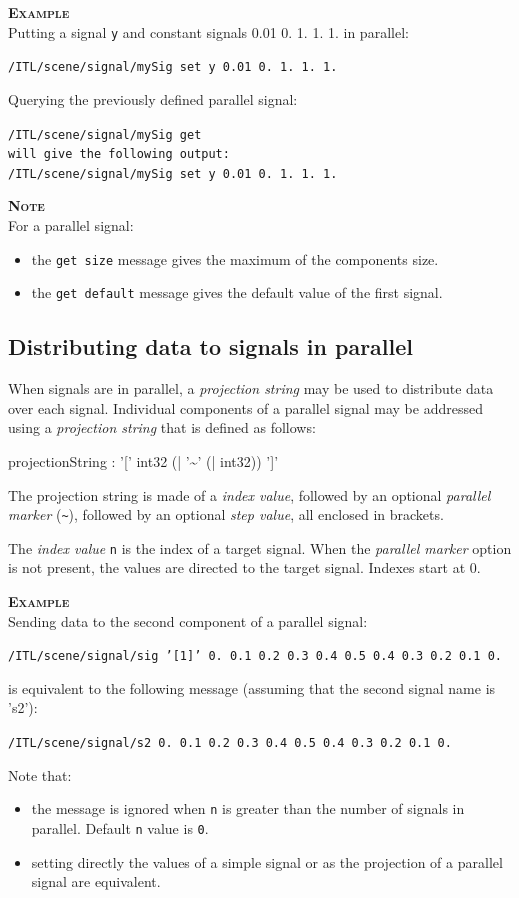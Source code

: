 \documentclass[a4paper,twoside]{report}
\newcommand{\subsublevel}[1]	{\subsection{#1}}
\newcommand{\OSC}[1]		{\texttt{#1}}
\newcommand{\values}[1]	{\texttt{#1}}
\newcommand{\example}		{\textbf{\hspace{-1.5cm}\textbf{\textsc{Example }}}}
\newcommand{\note}	[1]		{\vspace{2mm}\textbf{\hspace{-1.03cm}\textbf{\textsc{Note #1}}}}
\newcommand{\sample}	[1]			{\vspace{-2mm}\begin{center}\colorbox{mygrey}{
								\begin{minipage}[t]{0.9\columnwidth} 
								{\small \texttt{#1}}
								\end{minipage}}\end{center}}
\newcommand{\sampleindent}	{ \hspace{0.5cm} }
\begin{document}
\example \\
Putting a signal \OSC{y} and constant signals 0.01 0. 1. 1. 1. in parallel:
\sample{/ITL/scene/signal/mySig set y 0.01 0. 1. 1. 1.}
Querying the previously defined parallel signal:
\sample{/ITL/scene/signal/mySig get \\
will give the following output: \\
/ITL/scene/signal/mySig set y 0.01 0. 1. 1. 1.
}

\note{} \\
For a parallel signal:
\begin{itemize}
\item the \OSC{get size} message gives the maximum of the components size. 
\item the \OSC{get default} message gives the default value of the first signal. 
\end{itemize}

\subsublevel{Distributing data to signals in parallel}
\label{sigproj}

When signals are in parallel, a \emph{projection string} may be used to distribute data over each signal.
Individual components of a parallel signal may be addressed using a \emph{projection string} that is defined as follows:
\begin{rail}
projectionString :  '[' int32 (| '\~{}' (| int32)) ']'
\end{rail}

The projection string is made of a \emph{index value}, followed by an optional \emph{parallel marker} (\OSC{\~{}}), followed by an optional \emph{step value}, all enclosed in brackets.

The \emph{index value} \values{n} is the index of a target signal. When the \emph{parallel marker} option is not present, the values are directed to the target signal. Indexes start at 0.

\example \\
Sending data to the second component of a parallel signal:
\sample{/ITL/scene/signal/sig '[1]' 0.\ 0.1\ 0.2\ 0.3\ 0.4\ 0.5\ 0.4\ 0.3\ 0.2\ 0.1\ 0.}
\sampleindent is equivalent to the following message (assuming that the second signal name is 's2'):
\sample{/ITL/scene/signal/s2 0.\ 0.1\ 0.2\ 0.3\ 0.4\ 0.5\ 0.4\ 0.3\ 0.2\ 0.1\ 0.}

Note that:
\begin{itemize}
\item the message is ignored when \values{n} is greater than the number of signals in parallel. Default \values{n} value is \values{0}. 
\item setting directly the values of a simple signal or as the projection of a parallel signal are equivalent.
\end{itemize}
\end{document}
